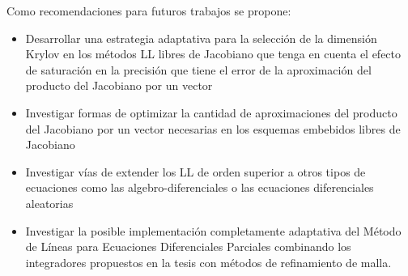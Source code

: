 \begin{recomendations}

Como recomendaciones para futuros trabajos se propone:
\begin{itemize}
	\item Desarrollar una estrategia adaptativa para la selección de la dimensión Krylov en los métodos LL libres de Jacobiano que tenga en cuenta el efecto de saturación en la precisión que tiene el error de la aproximación del producto del Jacobiano por un vector
	\item Investigar formas de optimizar la cantidad de aproximaciones del producto del Jacobiano por un vector necesarias en los esquemas embebidos libres de Jacobiano
	\item Investigar vías de extender los LL de orden superior a otros tipos de ecuaciones como las algebro-diferenciales o las ecuaciones diferenciales aleatorias
	\item Investigar la posible implementación completamente adaptativa del Método de Líneas para Ecuaciones Diferenciales Parciales combinando los integradores propuestos en la tesis con métodos de refinamiento de malla.
\end{itemize}

\end{recomendations}
